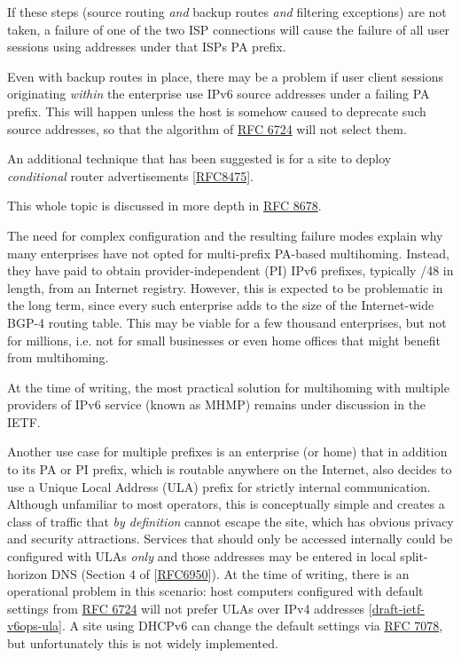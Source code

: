 \documentclass[
]{article}
\begin{document}
If these steps (source routing \emph{and} backup routes \emph{and}
filtering exceptions) are not taken, a failure of one of the two ISP
connections will cause the failure of all user sessions using addresses
under that ISP\textquotesingle s PA prefix.

Even with backup routes in place, there may be a problem if user client
sessions originating \emph{within} the enterprise use IPv6 source
addresses under a failing PA prefix. This will happen unless the host is
somehow caused to deprecate such source addresses, so that the algorithm
of \href{https://www.rfc-editor.org/info/rfc6724}{RFC 6724} will not
select them.

An additional technique that has been suggested is for a site to deploy
\emph{conditional} router advertisements
{[}\href{https://www.rfc-editor.org/info/rfc8475}{RFC8475}{]}.

This whole topic is discussed in more depth in
\href{https://www.rfc-editor.org/info/rfc8678}{RFC 8678}.

The need for complex configuration and the resulting failure modes
explain why many enterprises have not opted for multi-prefix PA-based
multihoming. Instead, they have paid to obtain provider-independent (PI)
IPv6 prefixes, typically /48 in length, from an Internet registry.
However, this is expected to be problematic in the long term, since
every such enterprise adds to the size of the Internet-wide BGP-4
routing table. This may be viable for a few thousand enterprises, but
not for millions, i.e. not for small businesses or even home offices
that might benefit from multihoming.

At the time of writing, the most practical solution for multihoming with
multiple providers of IPv6 service (known as MHMP) remains under
discussion in the IETF.

Another use case for multiple prefixes is an enterprise (or home) that
in addition to its PA or PI prefix, which is routable anywhere on the
Internet, also decides to use a Unique Local Address (ULA) prefix for
strictly internal communication. Although unfamiliar to most operators,
this is conceptually simple and creates a class of traffic that \emph{by
definition} cannot escape the site, which has obvious privacy and
security attractions. Services that should only be accessed internally
could be configured with ULAs \emph{only} and those addresses may be
entered in local split-horizon DNS (Section 4 of
{[}\href{https://www.rfc-editor.org/info/rfc6950}{RFC6950}{]}). At the
time of writing, there is an operational problem in this scenario: host
computers configured with default settings from
\href{https://www.rfc-editor.org/info/rfc6724}{RFC 6724} will not prefer
ULAs over IPv4 addresses
{[}\href{https://datatracker.ietf.org/doc/draft-ietf-v6ops-ula/}{draft-ietf-v6ops-ula}{]}.
A site using DHCPv6 can change the default settings via
\href{https://www.rfc-editor.org/info/rfc7078}{RFC 7078}, but
unfortunately this is not widely implemented.
\end{document}
